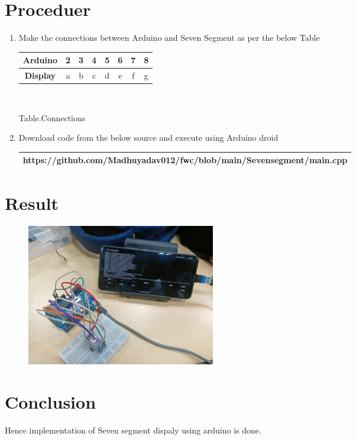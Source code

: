 \documentclass[journal,12pt,twocolumn]{IEEEtran}
\theoremstyle{remark}
\begin{document}
\section{Proceduer}
\begin{enumerate}
    \item Make the connections between Arduino and Seven Segment as per the below Table


\begin{table}[h!]
    \centering
    \small  %
    \begin{tabular}{|c|c|c|c|c|c|c|c|}
        \hline
        \textbf{Arduino}  & 2 & 3 & 4 & 5 & 6 & 7 & 8\\
        \hline
        \textbf{Display} &a&b&c&d&e&f&g\\
        \hline
    \end{tabular}\\
     \begin{center} 
 Table.Connections
 \end{center}
\end{table} 
    \item Download code from the below source and execute using Arduino droid \\

    \begin{tabularx}{0.46\textwidth} { 
  | >{\centering\arraybackslash}X |}
  \hline
 https://github.com/Madhuyadav012/fwc/blob/main/Sevensegment/main.cpp\\
  \hline
\end{tabularx}
 
\end{enumerate}


\section{Result}
\begin{figure}[h] 
	\centering 
	\includegraphics[width=0.4\textwidth]{a.jpg}
\centering	
\caption{\label{fig:Gate}}    
\end{figure}

\section{Conclusion}
Hence implementation of Seven segment dispaly using arduino is done.
\end{document}
